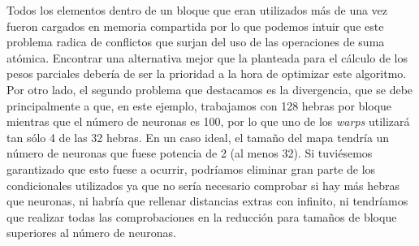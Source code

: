  Todos los elementos dentro de un bloque que eran utilizados más de una vez fueron cargados en memoria compartida por lo que podemos intuir que este problema radica de conflictos que surjan del uso de las operaciones de suma atómica. Encontrar una alternativa mejor que la planteada para el cálculo de los pesos parciales debería de ser la prioridad a la hora de optimizar este algoritmo. \\

 Por otro lado, el segundo problema que destacamos es la divergencia, que se debe principalmente a que, en este ejemplo, trabajamos con 128 hebras por bloque mientras que el número de neuronas es 100, por lo que uno de los \textit{warps} utilizará tan sólo 4 de las 32 hebras. En un caso ideal, el tamaño del mapa tendría un número de neuronas que fuese potencia de 2 (al menos 32). Si tuviésemos garantizado que esto fuese a ocurrir, podríamos eliminar gran parte de los condicionales utilizados ya que no sería necesario comprobar si hay más hebras que neuronas, ni habría que rellenar distancias extras con infinito, ni tendríamos que realizar todas las comprobaciones en la reducción para tamaños de bloque superiores al número de neuronas.

\newpage